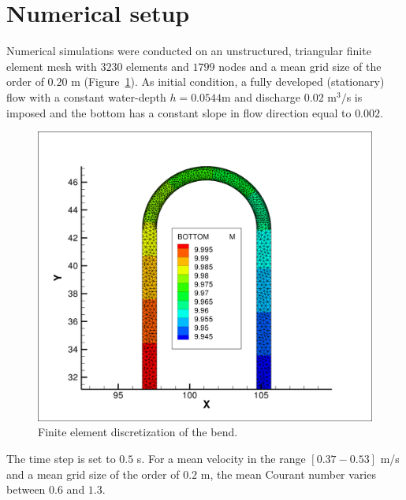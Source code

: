 %
%
\section{Numerical setup}
%
Numerical simulations were conducted on an unstructured, triangular finite
element mesh with $3230$ elements and $1799$ nodes and a mean grid size of the
order of $0.20$ m (Figure~\ref{fig:mesh}).  As initial condition, a fully
developed (stationary) flow with a constant water-depth $h = 0.0544$m and
discharge $0.02$ m$^3/$s is imposed and the bottom has a constant slope in flow
direction equal to $0.002$.

\begin{figure} [!h]
\centering
\includegraphics[scale=0.15]{yen_grid_bottom.png}
 \caption{Finite element discretization of the bend.}\label{fig:mesh}
\end{figure}

The time step is set to $0.5$ s. For a mean velocity in the range $[0.37-0.53]$
m/s and a mean grid size of the order of $0.2$ m, the mean Courant number
varies between $0.6$ and $1.3$.

